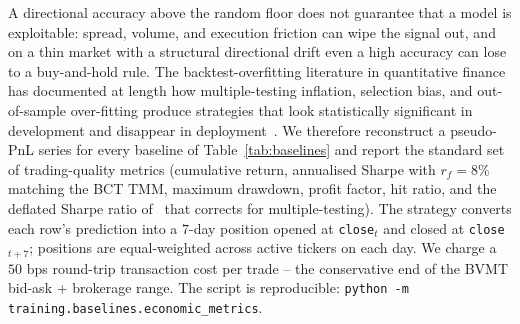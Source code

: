 \documentclass[conference]{IEEEtran}
\begin{document}
A directional accuracy above the random floor does not guarantee that a model is exploitable: spread, volume, and execution friction can wipe the signal out, and on a thin market with a structural directional drift even a high accuracy can lose to a buy-and-hold rule. The backtest-overfitting literature in quantitative finance has documented at length how multiple-testing inflation, selection bias, and out-of-sample over-fitting produce strategies that look statistically significant in development and disappear in deployment~\cite{ref:bailey_pseudo,ref:harvey_presidential}. We therefore reconstruct a pseudo-PnL series for every baseline of Table~\ref{tab:baselines} and report the standard set of trading-quality metrics (cumulative return, annualised Sharpe with $r_f = 8\%$ matching the BCT TMM, maximum drawdown, profit factor, hit ratio, and the deflated Sharpe ratio of~\cite{ref:deflated_sharpe} that corrects for multiple-testing). The strategy converts each row's prediction into a $7$-day position opened at \texttt{close}$_t$ and closed at \texttt{close}$_{t+7}$; positions are equal-weighted across active tickers on each day. We charge a $50$ bps round-trip transaction cost per trade -- the conservative end of the BVMT bid-ask + brokerage range. The script is reproducible: \texttt{python -m training.baselines.economic\_metrics}.
\end{document}
